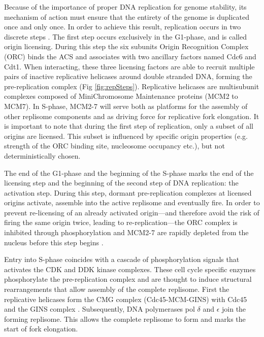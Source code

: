 Because of the importance of proper DNA replication for genome stability, its mechanism of action must ensure that the entirety of the genome is duplicated once and only once. 
In order to achieve this result, replication occurs in two discrete steps \cite{diffley:1994:two}.
The first step occurs exclusively in the G1-phase, and is called origin licensing.
During this step the six subunits Origin Recognition Complex (ORC) binds the ACS and associates with two ancillary factors named Cdc6 and Cdt1. 
When interacting, these three licensing factors are able to recruit multiple pairs of inactive replicative helicases around double stranded DNA, forming the pre-replication complex (Fig \ref{fig:repSteps})\cite{gambus:2011:mcm27, remus:2009:concerted, seki:2000:stepwise, rowles:1999:changes, donovan:1997:cdc6pdependent}.
Replicative helicases are multisubunit complexes composed of MiniChromosome Maintenance proteins (MCM2 to MCM7). 
In S-phase, MCM2-7 will serve both as platforms for the assembly of other replisome components and as driving force for replicative fork elongation. 
It is important to note that during the first step of replication, only a subset of all origins are licensed. This subset is influenced by specific origin properties (e.g. strength of the ORC binding site, nucleosome occupancy etc.), but not deterministically chosen.


The end of the G1-phase and the beginning of the S-phase marks the end of the licensing step and the beginning of the second step of DNA replication: the activation step. 
During this step, dormant pre-replication complexes at licensed origins activate, assemble into the active replisome and eventually fire. 
In order to prevent re-licensing of an already activated origin—and therefore avoid the risk of firing the same origin twice, leading to re-replication—the ORC complex is  inhibited through phosphorylation and MCM2-7 are rapidly depleted from the nucleus before this step begins \cite{nguyen:2001:cyclindependent}. 


Entry into S-phase coincides with a cascade of phosphorylation signals that activates the CDK and DDK kinase complexes. 
These cell cycle specific enzymes phosphorylate the pre-replication complex and are thought to induce structural rearrangements that allow assembly of the complete replisome. 
First the replicative helicases form the CMG complex (Cdc45-MCM-GINS) with Cdc45 and the GINS complex \cite{moyer:2006:isolation, aparicio:2009:human}. 
Subsequently, DNA polymerases pol $\delta$ and $\epsilon$ join the forming replisome. 
This allows the complete replisome to form and marks the start of fork elongation.


